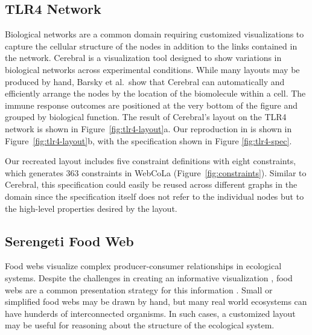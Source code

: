 \subsection{TLR4 Network}
\tlrfourSpec

Biological networks are a common domain requiring customized visualizations
to capture the cellular structure of the nodes in addition to the links
contained in the network. Cerebral \cite{barsky2008cerebral} is a visualization
tool designed to show variations in biological networks across experimental
conditions. While many layouts may be produced by hand, Barsky et al.\ show that 
Cerebral can automatically and efficiently arrange the nodes by the location
of the biomolecule within a cell. The immune response outcomes are positioned
at the very bottom of the figure and grouped by biological function. The result
of Cerebral's layout on the TLR4 network is shown in Figure~\ref{fig:tlr4-layout}a.
Our reproduction in \projectname is shown in Figure~\ref{fig:tlr4-layout}b,
with the specification shown in Figure \ref{fig:tlr4-spec}.



Our recreated layout includes five constraint definitions with eight \projectname
constraints, which generates $363$ constraints in WebCoLa (Figure~\ref{fig:constraints}).
Similar to Cerebral, this \projectname specification could easily be reused 
across different graphs in the domain since the specification itself does
not refer to the individual nodes but to the high-level properties desired
by the layout.

\subsection{Serengeti Food Web}
\krugerLayout
\serengetiLayout
\serengetiSpec

Food webs visualize complex producer-consumer relationships in ecological
systems. Despite the challenges in creating an informative
visualization \cite{kearney2016blog}, food webs are a common presentation strategy for this information
\cite{hinke2004visualizing,harper2006dynamic,lavigne1996cod,baskerville2011spatial,yodzis1998local,cohen2003ecological,benson2016higher,kruger2017}. Small or simplified food webs may be
drawn by hand, but many real world ecosystems can have hunderds of
interconnected organisms. In such cases, a customized layout may be useful
for reasoning about the structure of the ecological system.

